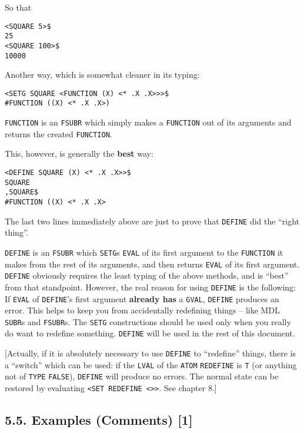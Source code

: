 \documentclass[a4paper,]{article}
\begin{document}
So that

\begin{verbatim}
<SQUARE 5>$
25
<SQUARE 100>$
10000
\end{verbatim}

Another way, which is somewhat cleaner in its typing:

\begin{verbatim}
<SETG SQUARE <FUNCTION (X) <* .X .X>>>$
#FUNCTION ((X) <* .X .X>)
\end{verbatim}

\texttt{FUNCTION} is an \texttt{FSUBR} which simply makes a \texttt{FUNCTION} out of its arguments and returns the created
\texttt{FUNCTION}.

This, however, is generally the \textbf{best} way:

\begin{verbatim}
<DEFINE SQUARE (X) <* .X .X>>$
SQUARE
,SQUARE$
#FUNCTION ((X) <* .X .X>
\end{verbatim}

The last two lines immediately above are just to prove that \texttt{DEFINE} did the ``right
thing''.

\texttt{DEFINE} is an \texttt{FSUBR} which \texttt{SETG}s \texttt{EVAL} of its first argument to the \texttt{FUNCTION} it
makes from the rest of its arguments, and then returns \texttt{EVAL} of its first argument. \texttt{DEFINE} obviously
requires the least typing of the above methods, and is ``best'' from that standpoint. However, the real reason for using
\texttt{DEFINE} is the following: If \texttt{EVAL} of \texttt{DEFINE}'s first argument \textbf{already has} a
\texttt{GVAL}, \texttt{DEFINE} produces an error. This helps to keep you from accidentally redefining things -- like MDL
\texttt{SUBR}s and \texttt{FSUBR}s. The \texttt{SETG} constructions should be used only when you really do want to redefine
something. \texttt{DEFINE} will be used in the rest of this document.

{[}Actually, if it is absolutely necessary to use \texttt{DEFINE} to ``redefine'' things, there is a ``switch'' which can
be used: if the \texttt{LVAL} of the \texttt{ATOM} \texttt{REDEFINE} is \texttt{T} (or
anything not of \texttt{TYPE} \texttt{FALSE}), \texttt{DEFINE} will produce no errors. The normal state can be restored by
evaluating \texttt{\textless{}SET\ REDEFINE\ \textless{}\textgreater{}\textgreater{}}. See chapter 8.{]}

\subsection{5.5. Examples (Comments) {[}1{]}}\label{examples-comments-1}
\end{document}
